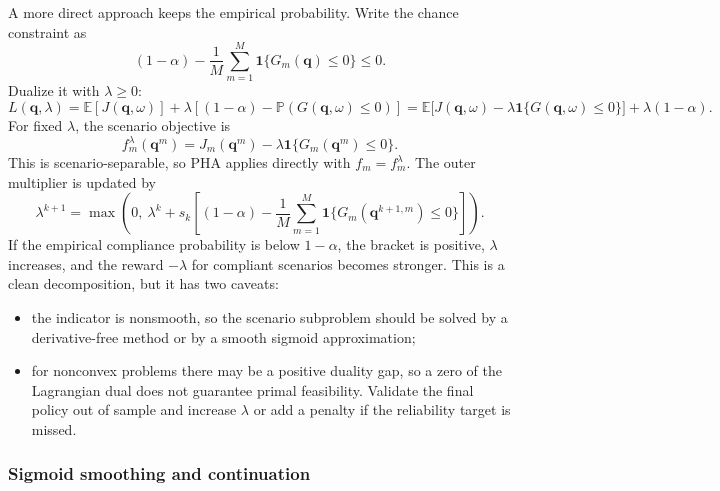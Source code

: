 \documentclass[11pt]{article}
\numberwithin{equation}{section}
\newcommand{\E}{\mathbb{E}}
\newcommand{\Prob}{\mathbb{P}}
\newcommand{\qq}{\mathbf{q}}
\newcommand{\ind}{\mathbf{1}}
\theoremstyle{plain}
\begin{document}
A more direct approach keeps the empirical probability.  Write the chance
constraint as
\begin{equation}
\label{eq:pha-prob}
(1-\alpha)-\frac{1}{M}\sum_{m=1}^{M}\ind\{G_m(\qq)\le0\}\le0.
\end{equation}
Dualize it with $\lambda\ge0$:
\begin{equation}
\label{eq:pha-prob-lag}
L(\qq,\lambda)
=\E[J(\qq,\omega)]
+\lambda\left[(1-\alpha)-\Prob(G(\qq,\omega)\le0)\right]
=\E\bigl[J(\qq,\omega)-\lambda\ind\{G(\qq,\omega)\le0\}\bigr]
+\lambda(1-\alpha).
\end{equation}
For fixed $\lambda$, the scenario objective is
\begin{equation}
\label{eq:pha-prob-scenario}
f_m^\lambda(\qq^m)=J_m(\qq^m)-\lambda\ind\{G_m(\qq^m)\le0\}.
\end{equation}
This is scenario-separable, so PHA applies directly with $f_m=f_m^\lambda$.
The outer multiplier is updated by
\begin{equation}
\label{eq:pha-prob-lambda}
\lambda^{k+1}
=\max\left(0,\
\lambda^k+s_k\left[(1-\alpha)
-\frac{1}{M}\sum_{m=1}^{M}\ind\{G_m(\qq^{k+1,m})\le0\}\right]\right).
\end{equation}
If the empirical compliance probability is below $1-\alpha$, the bracket is
positive, $\lambda$ increases, and the reward $-\lambda$ for compliant
scenarios becomes stronger.  This is a clean decomposition, but it has two
caveats:
\begin{itemize}[leftmargin=1.6em,itemsep=2pt]
  \item the indicator is nonsmooth, so the scenario subproblem should be
        solved by a derivative-free method or by a smooth sigmoid
        approximation;
  \item for nonconvex problems there may be a positive duality gap, so a
        zero of the Lagrangian dual does not guarantee primal feasibility.
        Validate the final policy out of sample and increase $\lambda$ or add
        a penalty if the reliability target is missed.
\end{itemize}

\subsubsection{Sigmoid smoothing and continuation}
\end{document}
